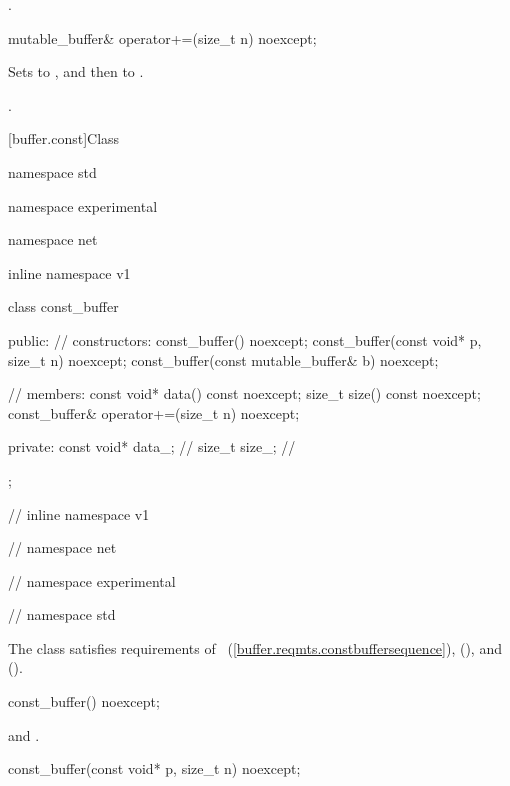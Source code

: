\begin{itemdescr}
\pnum
\returns {}.
\end{itemdescr}

%
\begin{itemdecl}
mutable_buffer& operator+=(size_t n) noexcept;
\end{itemdecl}

\begin{itemdescr}
\pnum
\effects Sets  to , and then  to .

\pnum
\returns {}.
\end{itemdescr}


[buffer.const]{Class }

\begin{codeblock}
namespace std {
namespace experimental {
namespace net {
inline namespace v1 {

  class const_buffer
  {
  public:
    // constructors:
    const_buffer() noexcept;
    const_buffer(const void* p, size_t n) noexcept;
    const_buffer(const mutable_buffer& b) noexcept;

    // members:
    const void* data() const noexcept;
    size_t size() const noexcept;
    const_buffer& operator+=(size_t n) noexcept;

  private:
    const void* data_; // \expos
    size_t size_; // \expos
  };

} // inline namespace v1
} // namespace net
} // namespace experimental
} // namespace std
\end{codeblock}

\pnum
The  class satisfies requirements of ~(\ref{buffer.reqmts.constbuffersequence}),  (), and  ().

%
\begin{itemdecl}
const_buffer() noexcept;
\end{itemdecl}

\begin{itemdescr}
\pnum
\postconditions {} and .
\end{itemdescr}

%
\begin{itemdecl}
const_buffer(const void* p, size_t n) noexcept;
\end{itemdecl}

